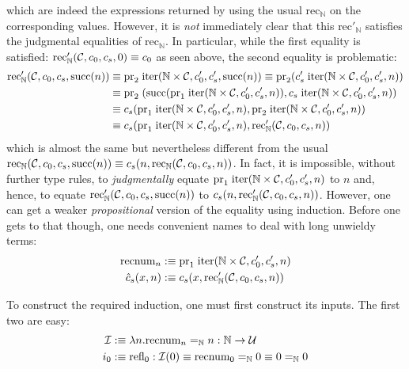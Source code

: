 which are indeed the expressions returned by using the usual $\text{rec}_{\mathbb{N}}$ on the corresponding values. However, it is \textit{not} immediately clear that this $\text{rec}'_{\mathbb{N}}$ satisfies the judgmental equalities of $\text{rec}_{\mathbb{N}}$. In particular, while the first equality is satisfied: $\text{rec}'_{\mathbb{N}}(\mathcal{C}, c_{0}, c_{s}, 0) \equiv c_{0}$ as seen above, the second equality is problematic:
\begin{align*}
	\text{rec}'_{\mathbb{N}}(\mathcal{C}, c_{0}, c_{s}, \text{succ}(n)) &\equiv \text{pr}_{2}\;\text{iter}(\mathbb{N} \times \mathcal{C}, c'_{0}, c'_{s}, \text{succ}(n)) \equiv \text{pr}_{2}(c'_{s}\;\text{iter}(\mathbb{N} \times \mathcal{C}, c'_{0}, c'_{s}, n)) \\
	&\equiv \text{pr}_{2}\;(\text{succ}(\text{pr}_{1}\;\text{iter}(\mathbb{N} \times \mathcal{C}, c'_{0}, c'_{s}, n)), c_{s}\;\text{iter}(\mathbb{N} \times \mathcal{C}, c'_{0}, c'_{s}, n)) \\
	&\equiv c_{s}(\text{pr}_{1}\;\text{iter}(\mathbb{N} \times \mathcal{C}, c'_{0}, c'_{s}, n),\text{pr}_{2}\;\text{iter}(\mathbb{N} \times \mathcal{C}, c'_{0}, c'_{s}, n)) \\
	&\equiv c_{s}(\text{pr}_{1}\;\text{iter}(\mathbb{N} \times \mathcal{C}, c'_{0}, c'_{s}, n),\text{rec}'_{\mathbb{N}}(\mathcal{C}, c_{0}, c_{s}, n))
\end{align*}
which is almost the same but nevertheless different from the usual $\text{rec}_{\mathbb{N}}(\mathcal{C}, c_{0}, c_{s}, \text{succ}(n)) \equiv c_{s}(n, \text{rec}_{\mathbb{N}}(\mathcal{C}, c_{0}, c_{s}, n))$. In fact, it is impossible, without further type rules, to \textit{judgmentally} equate $\text{pr}_{1}\;\text{iter}(\mathbb{N} \times \mathcal{C}, c'_{0}, c'_{s}, n)$ to $n$ and, hence, to equate $\text{rec}'_{\mathbb{N}}(\mathcal{C}, c_{0}, c_{s}, \text{succ}(n))$ to $c_{s}(n, \text{rec}'_{\mathbb{N}}(\mathcal{C}, c_{0}, c_{s}, n))$. However, one can get a weaker \textit{propositional} version of the equality using induction. Before one gets to that though, one needs convenient names to deal with long unwieldy terms:
\begin{align*}
	\text{recnum}_{n} &:\equiv \text{pr}_{1}\;\text{iter}(\mathbb{N} \times \mathcal{C}, c'_{0}, c'_{s}, n) \\
	\hat{c}_{s}(x,n) &:\equiv c_{s}(x,\text{rec}'_{\mathbb{N}}(\mathcal{C}, c_{0}, c_{s}, n))
\end{align*}

To construct the required induction, one must first construct its inputs. The first two are easy:
\begin{align*}
	\mathcal{I} &:\equiv \lambda n.\text{recnum}_{n} =_{\mathbb{N}} n : \mathbb{N} \to \mathcal{U} \\
	i_{0} &:\equiv \text{refl}_{0} : \mathcal{I}(0) \equiv \text{recnum}_{0} =_{\mathbb{N}} 0 \equiv 0 =_{\mathbb{N}} 0
\end{align*}

